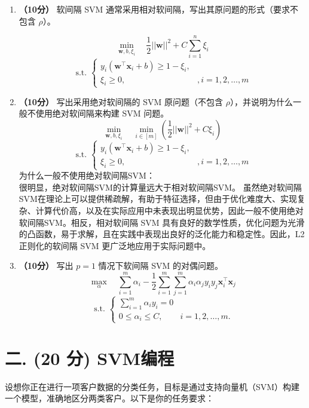 \documentclass[8pt]{article}
\begin{document}
\begin{enumerate}
    \item \textbf{（10分）} 软间隔 SVM 通常采用相对软间隔，写出其原问题的形式（要求不包含 \( \rho \)）。

\[ \min_{\mathbf{w}, b, {\xi_i}} \quad \frac{1}{2} | |\mathbf{w}| |^2 + C \sum_{i=1}^{n} \xi_i  \]
\[\text{ s.t. }
    \begin{cases} 
        y_i (\mathbf{w}^\top \mathbf{x}_i + b ) \geq 1 - \xi_i, 
        &\\
        \xi_i \geq 0, 
        & , i = 1, 2, \dots, m
    \end{cases} 
\]
    \item \textbf{（10分）} 写出采用绝对软间隔的 SVM 原问题（不包含 \( \rho \)），并说明为什么一般不使用绝对软间隔来构建 SVM 问题。
\[ \min_{\mathbf{w}, b, {\xi_i}}\quad  \min_{i\in[m]}
\left(
    \frac{1}{2} | |\mathbf{w}| |^2 + C  \xi_i 
\right) 
\]
\[\text{ s.t. }
    \begin{cases} 
        y_i (\mathbf{w}^\top \mathbf{x}_i + b ) \geq 1 - \xi_i, 
        &\\
        \xi_i \geq 0, 
        & , i = 1, 2, \dots, m
    \end{cases} 
\]
{\color{blue}为什么一般不使用绝对软间隔SVM：} \\
很明显，绝对软间隔SVM的计算量远大于相对软间隔SVM。
虽然绝对软间隔SVM在理论上可以提供稀疏解，有助于特征选择，但由于优化难度大、实现复杂、计算代价高，以及在实际应用中未表现出明显优势，因此一般不使用绝对软间隔SVM。相反，相对软间隔 SVM 具有良好的数学性质，优化问题为光滑的凸函数，易于求解，且在实践中表现出良好的泛化能力和稳定性。因此，L2 正则化的软间隔 SVM 更广泛地应用于实际问题中。
    \item \textbf{（10分）} 写出 \( p = 1 \) 情况下软间隔 SVM 的对偶问题。
    \[
    \max_{\alpha} \quad \sum_{i=1}^{m} \alpha_i - \frac{1}{2} \sum_{i=1}^{m} \sum_{j=1}^{m} \alpha_i \alpha_j y_i y_j \mathbf{x}_i^\top \mathbf{x}_j
    \]
    \[\text{ s.t. }
        \begin{cases}
            \sum_{i=1}^{m} \alpha_i y_i = 0 \\
            0 \leq \alpha_i \leq C, & i = 1, 2, \dots, m.
        \end{cases}
    \]
\end{enumerate}

\vspace{3em}

\section*{二. (20 分) SVM编程}
设想你正在进行一项客户数据的分类任务，目标是通过支持向量机（SVM）构建一个模型，准确地区分两类客户。以下是你的任务要求：
\end{document}
